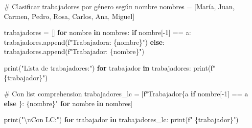 \documentclass[
  doc,
  floatsintext,
  longtable,
  a4paper,
  nolmodern,
  notxfonts,
  notimes,
  12pt,
  colorlinks=true,linkcolor=blue,citecolor=blue,urlcolor=blue]{apa7}
\newenvironment{Shaded}{\begin{snugshade}}{\end{snugshade}}
\newcommand{\BuiltInTok}[1]{\textcolor[rgb]{0.00,0.23,0.31}{#1}}
\newcommand{\CharTok}[1]{\textcolor[rgb]{0.13,0.47,0.30}{#1}}
\newcommand{\CommentTok}[1]{\textcolor[rgb]{0.37,0.37,0.37}{#1}}
\newcommand{\ControlFlowTok}[1]{\textcolor[rgb]{0.00,0.23,0.31}{\textbf{#1}}}
\newcommand{\DecValTok}[1]{\textcolor[rgb]{0.68,0.00,0.00}{#1}}
\newcommand{\KeywordTok}[1]{\textcolor[rgb]{0.00,0.23,0.31}{\textbf{#1}}}
\newcommand{\NormalTok}[1]{\textcolor[rgb]{0.00,0.23,0.31}{#1}}
\newcommand{\OperatorTok}[1]{\textcolor[rgb]{0.37,0.37,0.37}{#1}}
\newcommand{\SpecialCharTok}[1]{\textcolor[rgb]{0.37,0.37,0.37}{#1}}
\newcommand{\SpecialStringTok}[1]{\textcolor[rgb]{0.13,0.47,0.30}{#1}}
\newcommand{\StringTok}[1]{\textcolor[rgb]{0.13,0.47,0.30}{#1}}
\begin{document}
\begin{Shaded}
\begin{Highlighting}[]
\CommentTok{\# Clasificar trabajadores por género según nombre}
\NormalTok{nombres }\OperatorTok{=}\NormalTok{ [}\StringTok{\textquotesingle{}María\textquotesingle{}}\NormalTok{, }\StringTok{\textquotesingle{}Juan\textquotesingle{}}\NormalTok{, }\StringTok{\textquotesingle{}Carmen\textquotesingle{}}\NormalTok{, }\StringTok{\textquotesingle{}Pedro\textquotesingle{}}\NormalTok{, }\StringTok{\textquotesingle{}Rosa\textquotesingle{}}\NormalTok{, }\StringTok{\textquotesingle{}Carlos\textquotesingle{}}\NormalTok{, }\StringTok{\textquotesingle{}Ana\textquotesingle{}}\NormalTok{, }\StringTok{\textquotesingle{}Miguel\textquotesingle{}}\NormalTok{]}

\NormalTok{trabajadores }\OperatorTok{=}\NormalTok{ []}
\ControlFlowTok{for}\NormalTok{ nombre }\KeywordTok{in}\NormalTok{ nombres:}
    \ControlFlowTok{if}\NormalTok{ nombre[}\OperatorTok{{-}}\DecValTok{1}\NormalTok{] }\OperatorTok{==} \StringTok{\textquotesingle{}a\textquotesingle{}}\NormalTok{:}
\NormalTok{        trabajadores.append(}\SpecialStringTok{f"Trabajadora: }\SpecialCharTok{\{}\NormalTok{nombre}\SpecialCharTok{\}}\SpecialStringTok{"}\NormalTok{)}
    \ControlFlowTok{else}\NormalTok{:}
\NormalTok{        trabajadores.append(}\SpecialStringTok{f"Trabajador: }\SpecialCharTok{\{}\NormalTok{nombre}\SpecialCharTok{\}}\SpecialStringTok{"}\NormalTok{)}

\BuiltInTok{print}\NormalTok{(}\StringTok{"Lista de trabajadores:"}\NormalTok{)}
\ControlFlowTok{for}\NormalTok{ trabajador }\KeywordTok{in}\NormalTok{ trabajadores:}
    \BuiltInTok{print}\NormalTok{(}\SpecialStringTok{f"  }\SpecialCharTok{\{}\NormalTok{trabajador}\SpecialCharTok{\}}\SpecialStringTok{"}\NormalTok{)}

\CommentTok{\# Con list comprehension}
\NormalTok{trabajadores\_lc }\OperatorTok{=}\NormalTok{ [}\SpecialStringTok{f"Trabajador}\SpecialCharTok{\{}\StringTok{\textquotesingle{}a\textquotesingle{}} \ControlFlowTok{if}\NormalTok{ nombre[}\OperatorTok{{-}}\DecValTok{1}\NormalTok{] }\OperatorTok{==} \StringTok{\textquotesingle{}a\textquotesingle{}} \ControlFlowTok{else} \StringTok{\textquotesingle{}\textquotesingle{}}\SpecialCharTok{\}}\SpecialStringTok{: }\SpecialCharTok{\{}\NormalTok{nombre}\SpecialCharTok{\}}\SpecialStringTok{"} 
                   \ControlFlowTok{for}\NormalTok{ nombre }\KeywordTok{in}\NormalTok{ nombres]}

\BuiltInTok{print}\NormalTok{(}\StringTok{"}\CharTok{\textbackslash{}n}\StringTok{Con LC:"}\NormalTok{)}
\ControlFlowTok{for}\NormalTok{ trabajador }\KeywordTok{in}\NormalTok{ trabajadores\_lc:}
    \BuiltInTok{print}\NormalTok{(}\SpecialStringTok{f"  }\SpecialCharTok{\{}\NormalTok{trabajador}\SpecialCharTok{\}}\SpecialStringTok{"}\NormalTok{)}
\end{Highlighting}
\end{Shaded}
\end{document}
